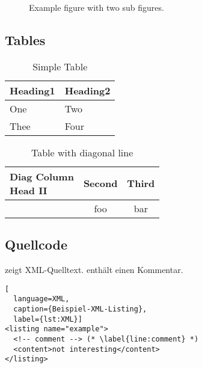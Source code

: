 \documentclass[runningheads,a4paper,ngerman]{llncs}[2022/01/12]
\begin{document}
\begin{ltgexample}
\begin{figure}[!b]
    \centering
  \hfil
  \caption{Example figure with two sub figures.}
  \label{fig:two_sub_figures}
\end{figure}
\end{ltgexample}

\subsection{Tables}

\begin{ltgexample}
\begin{table}
  \caption{Simple Table}
  \label{tab:simple}
  \centering
  \begin{tabular}{ll}
    \toprule
    Heading1 & Heading2 \\
    \midrule
    One      & Two      \\
    Thee     & Four     \\
    \bottomrule
  \end{tabular}
\end{table}
\end{ltgexample}

\begin{ltgexample}
\begin{table}
\caption{Table with diagonal line}
\label{tab:diag}
\begin{center}
\begin{tabular}{|l|c|c|}
\hline
\diagbox[width=10em]{Diag\\Column Head I}{Diag Column\\Head II} & Second & Third \\
\hline
& foo & bar \\
\hline
\end{tabular}
\end{center}
\end{table}
\end{ltgexample}


\subsection{Quellcode}

\begin{ltgexample}
 zeigt XML-Quelltext.
 enthält einen Kommentar.

\begin{lstlisting}[
  language=XML,
  caption={Beispiel-XML-Listing},
  label={lst:XML}]
<listing name="example">
  <!-- comment --> (* \label{line:comment} *)
  <content>not interesting</content>
</listing>
\end{lstlisting}
\end{ltgexample}
\end{document}
